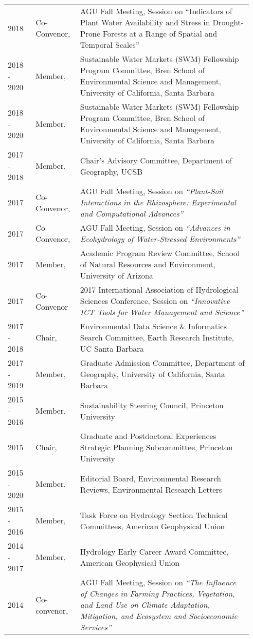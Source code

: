 \documentclass[10pt]{article}
\begin{document}
\begin{longtable}{p{.75in} p{1in} p{4.5in}}
2018 & Co-Convenor, & AGU Fall Meeting, Session on “Indicators of Plant Water Availability and Stress in Drought-Prone Forests at a Range of Spatial and Temporal Scales” \\
2018 - 2020 & Member, & Sustainable Water Markets (SWM) Fellowship Program Committee, Bren School of Environmental Science and Management, University of California, Santa Barbara \\
2018 - 2020 & Member, & Sustainable Water Markets (SWM) Fellowship Program Committee, Bren School of Environmental Science and Management, University of California, Santa Barbara \\
2017 - 2018 & Member, & Chair’s Advisory Committee, Department of Geography, UCSB \\
2017 & Co-Convenor, & AGU Fall Meeting, Session on \emph{``Plant-Soil Interactions in the Rhizosphere: Experimental and Computational Advances''} \\
2017 & Co-Convenor, & AGU Fall Meeting, Session on \emph{``Advances in Ecohydrology of Water-Stressed Environments''} \\
2017 & Member, & Academic Program Review Committee, School of Natural Resources and Environment, University of Arizona \\
2017 & Co-Convenor & 2017 International Association of Hydrological Sciences Conference, Session on \emph{``Innovative ICT Tools for Water Management and Science''} \\
2017 - 2018 & Chair, & Environmental Data Science \& Informatics Search Committee, Earth Research Institute, UC Santa Barbara \\ 
2017 - 2019 & Member, & Graduate Admission Committee, Department of Geography, University of California, Santa Barbara \\
2015 - 2016 & Member, & Sustainability Steering Council, Princeton University \\ 
2015 & Chair, & Graduate and Postdoctoral Experiences Strategic Planning Subcommittee, Princeton University \\
2015 - 2020 & Member, & Editorial Board, Environmental Research Reviews, Environmental Research Letters \\ 
2015 - 2016 & Member, & Task Force on Hydrology Section Technical Committees, American Geophysical Union \\ 
2014 - 2017 & Member, & Hydrology Early Career Award Committee, American Geophysical Union \\
2014 & Co-convenor, & AGU Fall Meeting, Session on \emph{``The Influence of Changes in Farming Practices, Vegetation, and Land Use on Climate Adaptation, Mitigation, and Ecosystem and Socioeconomic Services''}\\

\end{longtable}
\end{document}
